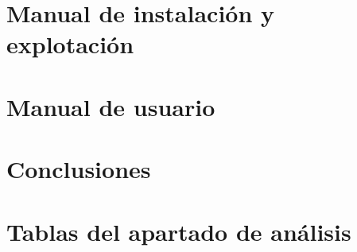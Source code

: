 \documentclass[a4paper,11pt]{book}
\begin{document}
\chapter{Manual de instalación y explotación}
\label{chap:maninsexp}


\chapter{Manual de usuario}


\chapter{Conclusiones}


\appendix
\chapter{Tablas del apartado de análisis}


\chapter*{\bibname}
\renewcommand{\bibname}{}



\begingroup
  \def\chapter*#1{}
\renewcommand{\bibname}{}



\backmatter



\end{document}
